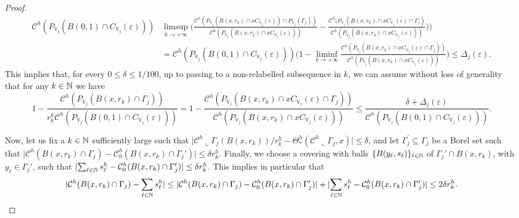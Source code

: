 \documentclass[10pt, a4paper,
oneside, headinclude,footinclude]{scrartcl}
\begin{document}
\begin{proof}
\begin{equation}
    \begin{split}
       \mathcal{C}^h(P_{\mathbb V_j}(B(0,1)\cap C_{\mathbb V_j}(\varepsilon)))& \limsup_{k\to+\infty}\Big(\frac{\mathcal{C}^h(P_{\mathbb V_j}(B(x,r_k)\cap xC_{\mathbb V_j}(\varepsilon))\cap P_{\mathbb V_j}(\Gamma_j))}{\mathcal{C}^h(P_{\mathbb V_j}(B(x,r_k)\cap xC_{\mathbb V_j}(\varepsilon)))}-\frac{\mathcal{C}^h(P_{\mathbb V_j}(B(x,r_k)\cap xC_{\mathbb V_j}(\varepsilon)\cap \Gamma_j)}{\mathcal{C}^h(P_{\mathbb V_j}(B(x,r_k)\cap xC_{\mathbb V_j}(\varepsilon)))})\Big)\\
       &= \mathcal{C}^h(P_{\mathbb V_j}(B(0,1)\cap C_{\mathbb V_j}(\varepsilon)))\Big(1-\liminf_{k\to+\infty}\frac{\mathcal{C}^h(P_{\mathbb V_j}(B(x,r_k)\cap xC_{\mathbb V_j}(\varepsilon)\cap \Gamma_j))}{\mathcal{C}^h(P_{\mathbb V_j}(B(x,r_k)\cap xC_{\mathbb V_j}(\varepsilon)))}\Big)\leq \Delta_j(\varepsilon).
       \nonumber
    \end{split}
\end{equation}
This implies that, for every $0\leq\delta\leq 1/100$, up to passing to a non-relabelled subsequence in $k$, we can assume without loss of generality that for any $k\in\mathbb{N}$ we have
$$
1-\frac{\mathcal{C}^h(P_{\mathbb V_j}(B(x,r_k)\cap \Gamma_j))}{r_k^h\mathcal{C}^h(P_{\mathbb V_j}(B(0,1)\cap C_{\mathbb V_j}(\varepsilon)))}= 1-\frac{\mathcal{C}^h(P_{\mathbb V_j}(B(x,r_k)\cap xC_{\mathbb V_j}(\varepsilon)\cap \Gamma_j))}{\mathcal{C}^h(P_{\mathbb V_j}(B(x,r_k)\cap xC_{\mathbb V_j}(\varepsilon)))}\leq \frac{\delta+\Delta_j(\varepsilon)}{\mathcal{C}^h(P_{\mathbb V_j}(B(0,1)\cap C_{\mathbb V_j}(\varepsilon)))}.
$$

Now, let us fix a $k\in\mathbb{N}$ sufficiently large such that
$\lvert \mathcal{C}^h\llcorner \Gamma_j(B(x,r_k))/r_k^h-\Theta^h_*(\mathcal{C}^h\llcorner\Gamma_j,x)\rvert\leq \delta$, and let $\Gamma^\prime_j \subseteq \Gamma_j$ be a Borel set such that $\lvert\mathcal{C}^h(B(x,r_k)\cap \Gamma_j)-\mathcal{C}_0^h(B(x,r_k)\cap \Gamma_j')\rvert\leq \delta r_k^h$. Finally, we choose a covering with balls $\{B(y_\ell,s_\ell)\}_{\ell\in \mathbb{N}}$ of $\Gamma_j' \cap B(x,r_k)$, with $y_\ell\in\Gamma_j'$,  such that $\lvert \sum_{\ell\in \mathbb{N}}s_\ell^h-\mathcal{C}^h_0 (B(x,r_k)\cap \Gamma_j^\prime)\rvert\leq \delta r_k^h$. This implies in particular that
\begin{equation}
    \lvert \mathcal{C}^h(B(x,r_k)\cap \Gamma_j)-\sum_{\ell\in\mathbb{N}}s_\ell^h\rvert\leq\lvert\mathcal{C}^h(B(x,r_k)\cap \Gamma_j)-\mathcal{C}_0^h(B(x,r_k)\cap \Gamma_j')\rvert+\lvert \sum_{\ell\in \mathbb{N}}s_\ell^h-\mathcal{C}^h_0 (B(x,r_k)\cap \Gamma_j^\prime)\rvert\leq 2\delta r_k^h.
    \label{eq:num5}
\end{equation}


\end{proof}
\end{document}
